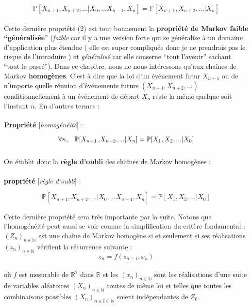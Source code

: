 \documentclass{article}
\begin{document}
\begin{equation}
\displaystyle \mathbb{P} [ X_{n+1},X_{n+2}, ... \vert X_0, ... X_{n-1}, X_n] = \mathbb{P}[ X_{n+1},X_{n+2}, ... \vert X_n]
\end{equation}
\\
Cette dernière propriété (2) est tout bonnement la \textbf{propriété de Markov faible ``généralisée"} (\textit{faible} car il y a une version forte qui se généralise à un domaine d'application plus étendue \textsf{( elle est super compliquée donc je ne prendrais pas le risque de l'introduire )} et \textit{généralisé} car elle conserne ``tout l'avenir'' sachant ``tout le passé''). Dans ce chapitre, nous ne nous intéressons qu'aux cha\^ines de Markov \textbf{homogènes}. C'est à dire que la loi d'un événement futur $X_{n+1}$ ou de n'importe quelle réunion d’événements futurs $(X_{n+1},X_{n+2}, ...)$ conditionnellement à un événement de départ $X_n$ reste la même quelque soit l'instant $n$. En d'autres termes :\\
\\
\textbf{Propriété} [\textit{homogénéité}] :

\begin{equation}
\displaystyle \forall n,\hspace{3mm}\mathbb{P}[ X_{n+1},X_{n+2}, ... \vert X_n] = \mathbb{P}[ X_{1},X_{2}, ... \vert X_0]
\end{equation}
\\
On établit donc la \textbf{règle d'oubli} des cha\^ines de Markov homogènes :\\
\\
\textbf{propriété} [\textit{règle d'oubli}] :

\begin{equation}
\displaystyle \mathbb{P} [ X_{n+1},X_{n+2}, ... \vert X_0, ... X_{n-1}, X_n] = \mathbb{P}[ X_{1},X_{2}, ... \vert X_0]
\end{equation}
\\
Cette dernière propriété sera très importante par la suite. Notons que l'homogénéité peut aussi se voir comme la simplification du critère fondamental : $(Z_n)_{n\in\mathbb{N}}$ est une cha\^ ine de Markov homogène si et seulement si ses réalisations $(z_n)_{n\in\mathbb{N}}$ vérifient la récurrence suivante :
\[z_n = \mathit{f}(z_{n-1},x_n)\]
\\
où $\mathit{f}$ est mesurable de $\mathbb{R}^2$ dans $\mathbb{R}$ et les $(x_n)_{n\in\mathbb{N}}$ sont les réalisations d'une suite de variables aléatoires $(X_n)_{n\in\mathbb{N}}$ toutes de même loi et telles que toutes les combinaisons possibles $(X_n)_{n\in\mathbb{I}\subset\mathbb{N}}$ soient indépendantes de $Z_0$.
\end{document}
